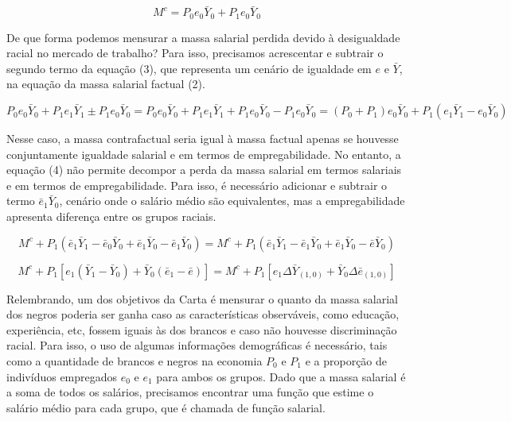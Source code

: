 \documentclass{article}
\begin{document}
	\begin{equation}
	M^{c} = P_{0}e_{0}\bar{Y}_{0} + P_{1}e_{0}\bar{Y}_{0}
	\end{equation}
	
	De que forma podemos mensurar a massa salarial perdida devido à desigualdade racial no mercado de trabalho? Para isso, precisamos acrescentar e subtrair o segundo termo da equação (3), que representa um cenário de igualdade em $e$ e $\bar{Y}$, na equação da massa salarial factual (2).
	
	\begin{equation}
	 P_{0}e_{0}\bar{Y}_{0} + P_{1}e_{1}\bar{Y}_{1} \pm P_{1}e_{0}\bar{Y}_{0} =  P_{0}e_{0}\bar{Y}_{0} + P_{1}e_{1}\bar{Y}_{1} + P_{1}e_{0}\bar{Y}_{0} - P_{1}e_{0}\bar{Y}_{0} = (P_{0} +  P_{1})e_{0}\bar{Y}_{0}  + P_{1}(e_{1}\bar{Y}_{1} - e_{0}\bar{Y}_{0})
	\end{equation} 
	
	Nesse caso, a massa contrafactual seria igual à massa factual apenas se houvesse conjuntamente igualdade salarial e em termos de empregabilidade. No entanto, a equação (4) não permite decompor a perda da massa salarial em termos salariais e em termos de empregabilidade. Para isso, é necessário adicionar e subtrair o termo $\bar{e}_{1}\bar{Y}_{0}$, cenário onde o salário médio são equivalentes, mas a empregabilidade apresenta diferença entre os grupos raciais. \newline
	
	\begin{equation}
		M^{c} + P_{1}(\bar{e}_{1}\bar{Y}_{1} - \bar{e}_{0}\bar{Y}_{0} + \bar{e}_{1}\bar{Y}_{0} - \bar{e}_{1}\bar{Y}_{0}) = M^{c} + P_{1}(\bar{e}_{1}\bar{Y}_{1} - \bar{e}_{1}\bar{Y}_{0} + \bar{e}_{1}\bar{Y}_{0} - \bar{e}\bar{Y}_{0})
	\end{equation}
	
	\begin{equation}
		M^{c} + P_{1}[e_{1}(\bar{Y}_{1} - \bar{Y}_{0}) + \bar{Y}_{0}(\bar{e}_{1} - \bar{e} )] =  M^{c} + P_{1}[e_{1}\Delta \bar{Y}_{(1,0)} + \bar{Y}_{0}\Delta \bar{e}_{(1,0)}]
	\end{equation}

	
	Relembrando, um dos objetivos da Carta é mensurar o quanto da massa salarial dos negros poderia ser ganha caso as características observáveis, como educação, experiência, etc, fossem iguais às dos brancos e caso não houvesse discriminação racial. Para isso, o uso de algumas informações demográficas é necessário, tais como a quantidade de brancos e negros na economia $P_{0}$ e $P_{1}$ e a proporção de indivíduos empregados $e_{0}$ e $e_{1}$ para ambos os grupos. Dado que a massa salarial é a soma de todos os salários, precisamos encontrar uma função que estime o salário médio para cada grupo, que é chamada de função salarial.
	
\end{document}
